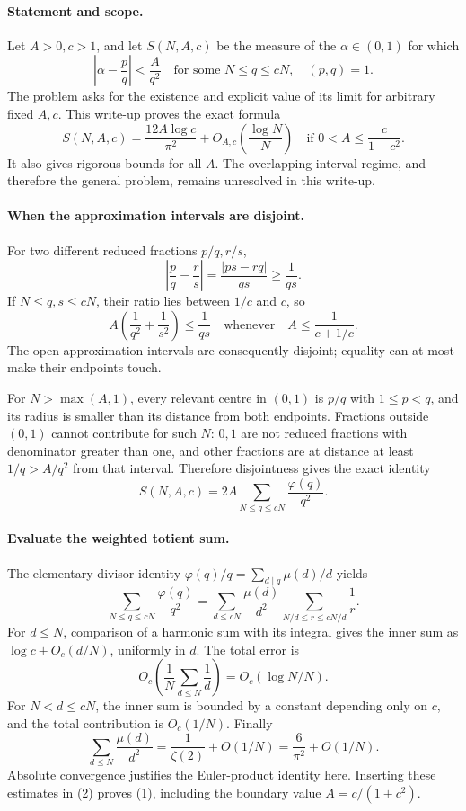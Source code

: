 \paragraph{Statement and scope.}
Let \(A>0,c>1\), and let \(S(N,A,c)\) be the measure of the \(\alpha\in(0,1)\) for which
\[
 \left|\alpha-\frac pq\right|<\frac A{q^2}
 \quad\text{for some }N\leq q\leq cN,\quad (p,q)=1.
\]
The problem asks for the existence and explicit value of its limit for arbitrary fixed \(A,c\). This write-up proves the exact formula
\[
 S(N,A,c)=\frac{12A\log c}{\pi^2}
       +O_{A,c}\!\left(\frac{\log N}{N}\right)
 \quad\text{if }0<A\leq\frac{c}{1+c^2}.
\tag{1}
\]
It also gives rigorous bounds for all \(A\). The overlapping-interval regime, and therefore the general problem, remains unresolved in this write-up.

\paragraph{When the approximation intervals are disjoint.}
For two different reduced fractions \(p/q,r/s\),
\[
 \left|\frac pq-\frac rs\right|
 =\frac{|ps-rq|}{qs}\geq\frac1{qs}.
\]
If \(N\leq q,s\leq cN\), their ratio lies between \(1/c\) and \(c\), so
\[
 A\left(\frac1{q^2}+\frac1{s^2}\right)
 \leq\frac1{qs}
 \quad\text{whenever}\quad A\leq\frac1{c+1/c}.
\]
The open approximation intervals are consequently disjoint; equality can at most make their endpoints touch.

For \(N>\max(A,1)\), every relevant centre in \((0,1)\) is \(p/q\) with \(1\leq p<q\), and its radius is smaller than its distance from both endpoints. Fractions outside \((0,1)\) cannot contribute for such \(N\): \(0,1\) are not reduced fractions with denominator greater than one, and other fractions are at distance at least \(1/q>A/q^2\) from that interval. Therefore disjointness gives the exact identity
\[
 S(N,A,c)=2A\sum_{N\leq q\leq cN}\frac{\varphi(q)}{q^2}.
\tag{2}
\]

\paragraph{Evaluate the weighted totient sum.}
The elementary divisor identity
\(\varphi(q)/q=\sum_{d\mid q}\mu(d)/d\) yields
\[
 \sum_{N\leq q\leq cN}\frac{\varphi(q)}{q^2}
 =\sum_{d\leq cN}\frac{\mu(d)}{d^2}
       \sum_{N/d\leq r\leq cN/d}\frac1r.
\]
For \(d\leq N\), comparison of a harmonic sum with its integral gives the inner sum as
\(\log c+O_c(d/N)\), uniformly in \(d\). The total error is
\[
 O_c\!\left(\frac1N\sum_{d\leq N}\frac1d\right)
 =O_c(\log N/N).
\]
For \(N<d\leq cN\), the inner sum is bounded by a constant depending only on \(c\), and the total contribution is \(O_c(1/N)\). Finally
\[
 \sum_{d\leq N}\frac{\mu(d)}{d^2}
 =\frac1{\zeta(2)}+O(1/N)=\frac6{\pi^2}+O(1/N).
\]
Absolute convergence justifies the Euler-product identity here. Inserting these estimates in (2) proves (1), including the boundary value \(A=c/(1+c^2)\).

